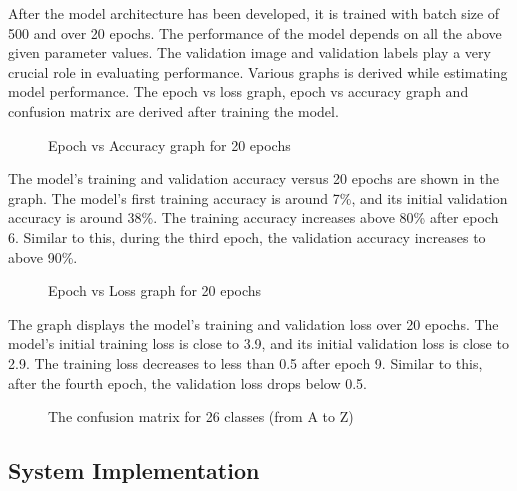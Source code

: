 \documentclass[fleqn, 11pt, twoside]{IOEGC}
\begin{document}
After the model architecture has been developed, it is trained with batch size of 500 and over 20 epochs. The performance of the model depends on all the above given parameter values. The validation image and validation labels play a very crucial role in evaluating performance. Various graphs is derived while estimating model performance. The epoch vs loss graph, epoch vs accuracy graph and confusion matrix are derived after training the model.

\begin{figure}[H]\centering
	\caption{Epoch vs Accuracy graph for 20 epochs}
	\label{fig:epoch accuracy}
\end{figure}

The model's training and validation accuracy versus 20 epochs are shown in the graph. The model's first training accuracy is around 7\%, and its initial validation accuracy is around 38\%. The training accuracy increases above 80\% after epoch 6. Similar to this, during the third epoch, the validation accuracy increases to above 90\%.

\begin{figure}[H]\centering
	\caption{Epoch vs Loss graph for 20 epochs}
	\label{fig:epoch loss}
\end{figure}

The graph displays the model's training and validation loss over 20 epochs. The model's initial training loss is close to 3.9, and its initial validation loss is close to 2.9. The training loss decreases to less than 0.5 after epoch 9. Similar to this, after the fourth epoch, the validation loss drops below 0.5.

\begin{figure}[H]\centering
	\caption{The confusion matrix for 26 classes (from A to Z)}
	\label{fig:confusion matrix}
\end{figure}

\subsection{System Implementation}
\end{document}
